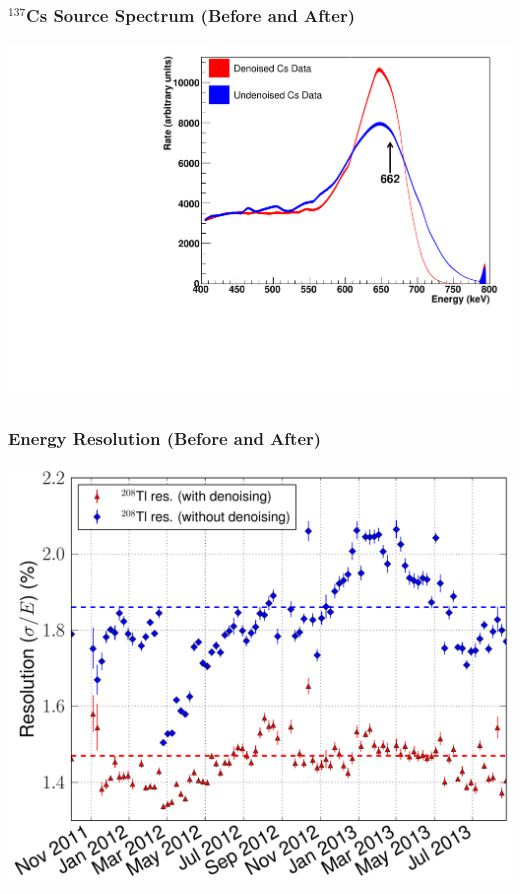 \documentclass{beamer}
\begin{document}
\begin{frame}
\begin{center}
\frametitle{$^{137}$Cs Source Spectrum (Before and After)}
\end{center}
\vspace{1cm}
\begin{center}
\includegraphics[keepaspectratio=true,width=\textwidth]{CsSourceSpectrumComparison.pdf}
\end{center}
\end{frame}

\begin{frame}
\begin{center}
\frametitle{Energy Resolution (Before and After)}
\end{center}
\vspace{0.6cm}
\begin{center}
\includegraphics[keepaspectratio=true,width=.95\textwidth]{RotatedReso_denoised_compVsTime.pdf}
\end{center}
\end{frame}
\end{document}
